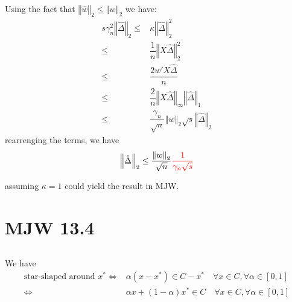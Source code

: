 \documentclass[11pt,a4paper]{ctexart}
\numberwithin{equation}{section}%
\begin{document}
\subsection{}
Using the fact that $ \left\Vert \hat{w} \right\Vert _2 \leq \left\Vert w \right\Vert _2  $ we have:
\begin{align*}
    s\gamma _n^2\left\Vert \hat{\Delta } \right\Vert _2\leq&    \kappa \left\Vert \hat{\Delta } \right\Vert _2^2 \\
    \leq & \dfrac{ 1 }{ n  } \left\Vert X\hat{\Delta } \right\Vert _2^2 \\
    \leq & \dfrac{ 2w'X\hat{\Delta } }{ n  } \\
    \leq & \dfrac{ 2 }{ n  } \left\Vert X\hat{\Delta  } \right\Vert _\infty \left\Vert \hat{\Delta  } \right\Vert _1\\
    \leq & \dfrac{ \gamma _n  }{ \sqrt{n} }\left\Vert w \right\Vert _2 \sqrt{s} \left\Vert \hat{\Delta } \right\Vert _2 
\end{align*}
rearrenging the terms, we have
\begin{align*}
    \left\Vert \hat{\Delta } \right\Vert _2 \leq \dfrac{ \left\Vert w \right\Vert _2 }{ \sqrt{n} } \color{red}\dfrac{ 1 }{ \gamma _n \sqrt{s} }
\end{align*}

{\color{red} assuming $ \kappa =1 $ could yield the result in MJW.}


\section{MJW 13.4}

\subsection{}

We have
\begin{align*}
    \text{star-shaped around }x^*\Leftrightarrow & \alpha (x-x^*)\in C-x^* \quad \forall x\in C, \forall \alpha \in [0,1]\\
    \Leftrightarrow & \alpha x + (1-\alpha)x^*\in C \quad \forall x\in C, \forall \alpha \in [0,1]
\end{align*}

\subsection{}
\end{document}
